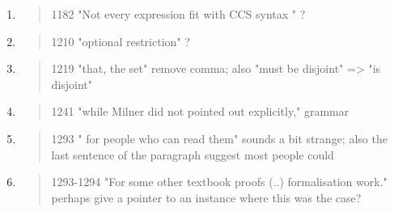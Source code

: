\begin{enumerate}
  \item \begin{quote}
1182 "Not every expression fit with CCS syntax " ?
\end{quote}
  \Mark

  \item \begin{quote}
1210 "optional restriction" ?
\end{quote}
  \Mark

  \item \begin{quote}
1219 "that, the set" remove comma; also "must be disjoint" => "is disjoint"
\end{quote}
  \Mark

  \item \begin{quote}
1241 "while Milner did not pointed out explicitly," grammar
\end{quote}
  \Mark

  \item \begin{quote}
1293 " for people who can read them" sounds a bit strange; also the last sentence of the paragraph suggest most people could
\end{quote}
  \Mark

  \item \begin{quote}
1293-1294 "For some other textbook proofs (..) formalisation work." perhaps give a pointer to an instance where this was the case?
\end{quote}
  \Mark

\end{enumerate}
